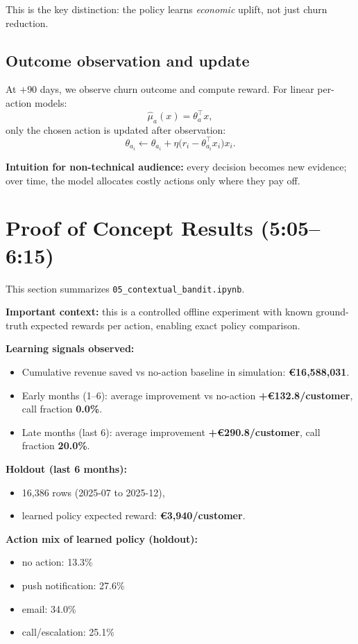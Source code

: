 \documentclass[11pt,a4paper]{article}
\providecommand{\EUR}[1]{\euro{}#1}
\begin{document}
This is the key distinction: the policy learns \emph{economic} uplift, not just churn reduction.

\subsection*{Outcome observation and update}
At $+90$ days, we observe churn outcome and compute reward. For linear per-action models:
\[
\hat\mu_a(x)=\theta_a^\top x,
\]
only the chosen action is updated after observation:
\[
\theta_{a_i}\leftarrow\theta_{a_i}+\eta\big(r_i-\theta_{a_i}^\top x_i\big)x_i.
\]

\textbf{Intuition for non-technical audience:} every decision becomes new evidence; over time, the model allocates costly actions only where they pay off.

\section{Proof of Concept Results (5:05--6:15)}
This section summarizes \texttt{05\_contextual\_bandit.ipynb}.

\textbf{Important context:} this is a controlled offline experiment with known ground-truth expected rewards per action, enabling exact policy comparison.

\textbf{Learning signals observed:}
\begin{itemize}
    \item Cumulative revenue saved vs no-action baseline in simulation: \textbf{\EUR{16,588,031}}.
    \item Early months (1--6): average improvement vs no-action \textbf{+\EUR{132.8}/customer}, call fraction \textbf{0.0\%}.
    \item Late months (last 6): average improvement \textbf{+\EUR{290.8}/customer}, call fraction \textbf{20.0\%}.
\end{itemize}

\textbf{Holdout (last 6 months):}
\begin{itemize}
    \item 16,386 rows (2025-07 to 2025-12),
    \item learned policy expected reward: \textbf{\EUR{3,940}/customer}.
\end{itemize}

\textbf{Action mix of learned policy (holdout):}
\begin{itemize}
    \item no action: 13.3\%
    \item push notification: 27.6\%
    \item email: 34.0\%
    \item call/escalation: 25.1\%
\end{itemize}
\end{document}
